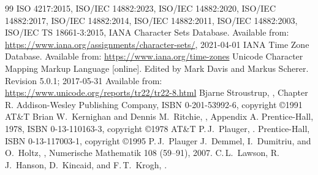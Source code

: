 
\renewcommand{\leftmark}{\bibname}

\begin{thebibliography}{99}
  ISO 4217:2015,
  ISO/IEC 14882:2023,
  ISO/IEC 14882:2020,
  ISO/IEC 14882:2017,
  ISO/IEC 14882:2014,
  ISO/IEC 14882:2011,
  ISO/IEC 14882:2003,
  ISO/IEC TS 18661-3:2015,
  IANA Character Sets Database.
  Available from:\newline
  \url{https://www.iana.org/assignments/character-sets/}, 2021-04-01
  IANA Time Zone Database.
  Available from: \url{https://www.iana.org/time-zones}
  Unicode Character Mapping Markup Language [online].
  Edited by Mark Davis and Markus Scherer. Revision 5.0.1; 2017-05-31
  Available from: \url{https://www.unicode.org/reports/tr22/tr22-8.html}
  Bjarne Stroustrup,
  , Chapter R\@.
  Addison-Wesley Publishing Company, ISBN 0-201-53992-6, copyright \copyright 1991 AT\&T
  Brian W.\ Kernighan and Dennis M.\ Ritchie,
  , Appendix A\@.
  Prentice-Hall, 1978, ISBN 0-13-110163-3, copyright \copyright 1978 AT\&T
  P.\,J.\ Plauger,
  .
  Prentice-Hall, ISBN 0-13-117003-1, copyright \copyright 1995 P.\,J.\ Plauger
  J.\ Demmel, I.\ Dumitriu, and O.\ Holtz,
  ,
  Numerische Mathematik 108 (59--91), 2007.
  C.\,L.\ Lawson, R.\,J.\ Hanson, D.\ Kincaid, and F.\,T.\ Krogh,
  .

\end{thebibliography}
